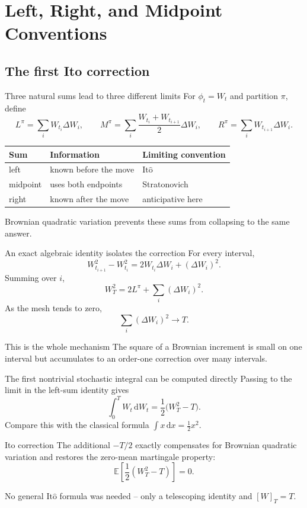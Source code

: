 \documentclass[handout,10pt,aspectratio=169]{beamer}
\newcommand{\E}{\mathbb E}
\newcommand{\dd}{\,\mathrm d}
\newcommand{\Ito}{\mathrm{It\hat{o}}}
\begin{document}
\section{Left, Right, and Midpoint Conventions}
\subsection{The first Ito correction}

\begin{frame}{Three natural sums lead to three different limits}
For \(\phi_t=W_t\) and partition \(\pi\), define
\[
L^\pi=\sum_iW_{t_i}\Delta W_i,
\qquad
M^\pi=\sum_i\frac{W_{t_i}+W_{t_{i+1}}}{2}\Delta W_i,
\qquad
R^\pi=\sum_iW_{t_{i+1}}\Delta W_i.
\]
\begin{center}
\begin{tabular}{lll}
\toprule
Sum & Information & Limiting convention \\
\midrule
left & known before the move & \(\Ito\) \\
midpoint & uses both endpoints & Stratonovich \\
right & known after the move & anticipative here \\
\bottomrule
\end{tabular}
\end{center}
Brownian quadratic variation prevents these sums from collapsing to the same answer.
\end{frame}

\begin{frame}{An exact algebraic identity isolates the correction}
For every interval,
\[
W_{t_{i+1}}^2-W_{t_i}^2
=2W_{t_i}\Delta W_i+(\Delta W_i)^2.
\]
Summing over \(i\),
\[
W_T^2
=2L^\pi+\sum_i(\Delta W_i)^2.
\]
As the mesh tends to zero,
\[
\sum_i(\Delta W_i)^2\longrightarrow T.
\]
\begin{block}{This is the whole mechanism}
The square of a Brownian increment is small on one interval but accumulates to an order-one correction over many intervals.
\end{block}
\end{frame}

\begin{frame}{The first nontrivial stochastic integral can be computed directly}
Passing to the limit in the left-sum identity gives
\[
\boxed{
\int_0^T W_t\dd W_t
=\frac12\bigl(W_T^2-T\bigr).}
\]
Compare this with the classical formula \(\int x\dd x=\frac12x^2\).
\begin{block}{Ito correction}
The additional \(-T/2\) exactly compensates for Brownian quadratic variation and restores the zero-mean martingale property:
\[
\E\left[\frac12(W_T^2-T)\right]=0.
\]
\end{block}
No general \(\Ito\) formula was needed -- only a telescoping identity and \([W]_T=T\).
\end{frame}
\end{document}
